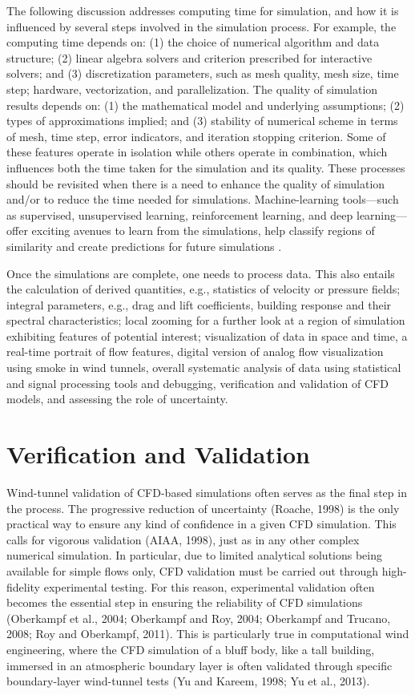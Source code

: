 The following discussion addresses computing time for simulation, and how it is influenced by several steps involved in the simulation process. For example, the computing time depends on: (1) the choice of numerical algorithm and data structure; (2) linear algebra solvers and criterion prescribed for interactive solvers; and (3) discretization parameters, such as mesh quality, mesh size, time step; hardware, vectorization, and parallelization. The quality of simulation results depends on: (1) the mathematical model and underlying assumptions; (2) types of approximations implied; and (3) stability of numerical scheme in terms of mesh, time step, error indicators, and iteration stopping criterion. Some of these features operate in isolation while others operate in combination, which influences both the time taken for the simulation and its quality. These processes should be revisited when there is a need to enhance the quality of simulation and/or to reduce the time needed for simulations. Machine-learning tools—such as supervised, unsupervised learning, reinforcement learning, and deep learning—offer exciting avenues to learn from the simulations, help classify regions of similarity and create predictions for future simulations \citep{kareem2018generalized}.

Once the simulations are complete, one needs to process data. This also entails the calculation of derived quantities, e.g., statistics of velocity or pressure fields; integral parameters, e.g., drag and lift coefficients, building response and their spectral characteristics; local zooming for a further look at a region of simulation exhibiting features of potential interest; visualization of data in space and time, a real-time portrait of flow features, digital version of analog flow visualization using smoke in wind tunnels, overall systematic analysis of data using statistical and signal processing tools and debugging, verification and validation of CFD models, and assessing the role of uncertainty.

\section{Verification and Validation}
\label{sec:resp_cfd_wind_flow_modeling}

Wind-tunnel validation of CFD-based simulations often serves as the final step in the process. The progressive reduction of uncertainty (Roache, 1998) is the only practical way to ensure any kind of confidence in a given CFD simulation. This calls for vigorous validation (AIAA, 1998), just as in any other complex numerical simulation. In particular, due to limited analytical solutions being available for simple flows only, CFD validation must be carried out through high-fidelity experimental testing. For this reason, experimental validation often becomes the essential step in ensuring the reliability of CFD simulations (Oberkampf et al., 2004; Oberkampf and Roy, 2004; Oberkampf and Trucano, 2008; Roy and Oberkampf, 2011). This is particularly true in computational wind engineering, where the CFD simulation of a bluff body, like a tall building, immersed in an atmospheric boundary layer is often validated through specific boundary-layer wind-tunnel tests (Yu and Kareem, 1998; Yu et al., 2013).

